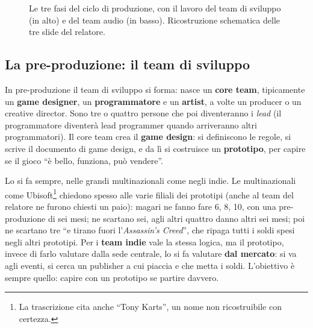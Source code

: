 \begin{figure}[htbp]
\caption{Le tre fasi del ciclo di produzione, con il lavoro del team di sviluppo
(in alto) e del team audio (in basso). Ricostruzione schematica delle tre slide
del relatore.}
\label{z9:fig:ciclo}
\end{figure}

\subsection{La pre-produzione: il team di sviluppo}

In pre-produzione il team di sviluppo si forma: nasce un \textbf{core team},
tipicamente un \textbf{game designer}, un \textbf{programmatore} e un
\textbf{artist}, a volte un producer o un creative director. Sono tre o quattro
persone che poi diventeranno i \emph{lead} (il programmatore diventerà lead
programmer quando arriveranno altri programmatori). Il core team crea il
\textbf{game design}: si definiscono le regole, si scrive il documento di game
design, e da lì si costruisce un \textbf{prototipo}, per capire se il gioco ``è
bello, funziona, può vendere''.

Lo si fa sempre, nelle grandi multinazionali come negli indie. Le multinazionali
come Ubisoft\footnote{La trascrizione cita anche ``Tony Karts'', un nome non
ricostruibile con certezza.} chiedono spesso alle varie filiali dei prototipi
(anche al team del relatore ne furono chiesti un paio): magari ne fanno fare 6, 8,
10, con una pre-produzione di sei mesi; ne scartano sei, agli altri quattro
danno altri sei mesi; poi ne scartano tre ``e tirano fuori l'\emph{Assassin's
Creed}'', che ripaga tutti i soldi spesi negli altri prototipi. Per i
\textbf{team indie} vale la stessa logica, ma il prototipo, invece di farlo
valutare dalla sede centrale, lo si fa valutare \textbf{dal mercato}: si va agli
eventi, si cerca un publisher a cui piaccia e che metta i soldi. L'obiettivo è
sempre quello: capire con un prototipo se partire davvero.

